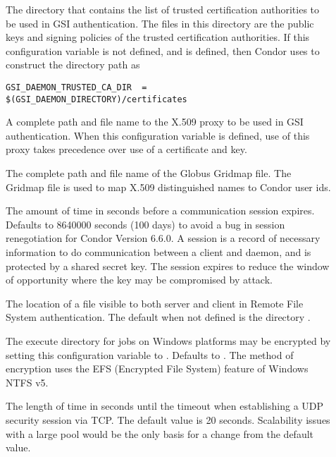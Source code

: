 \begin{description}
\item[]
\label{param:GSIDaemonTrustedCADir} The directory that contains the
list of trusted certification authorities to be used in GSI authentication.
The files in this directory are the public keys and signing policies
of the trusted certification authorities.
If this configuration variable is not defined, and
 is defined, then Condor uses
 to construct the directory path as
\begin{verbatim}
GSI_DAEMON_TRUSTED_CA_DIR  = $(GSI_DAEMON_DIRECTORY)/certificates
\end{verbatim}

\item[]
\label{param:GSIDaemonProxy} A complete path and file name to the
X.509 proxy to be used in GSI authentication.
When this configuration variable is defined, use of this proxy
takes precedence over use of a certificate and key.

\item[]
\label{param:GridMap}
The complete path and file name of the Globus Gridmap file.
The Gridmap file is used to map
X.509 distinguished names to Condor user ids.

\item[]
\label{param:SessionDuration} The amount of time in seconds before
a communication session expires.
Defaults to 8640000 seconds (100 days) to avoid a bug in session
renegotiation for Condor Version 6.6.0.
A session is a record of necessary information to do communication
between a client and daemon, and is protected by a shared secret key.
The session expires to reduce the window of opportunity where
the key may be compromised by attack.

\item[]
\label{param:FSRemoteDir}
The location of a file visible to both server and client in
Remote File System authentication.
The default when not defined is the directory 
.

\item[]
\label{param:EncryptExecuteDirectory}
The execute directory for jobs on Windows platforms may be
encrypted by setting this configuration variable to .
Defaults to .
The method of encryption uses the EFS (Encrypted File System)
feature of Windows NTFS v5.

\item[]
\label{param:SecTCPSessionTimeout}
The length of time in seconds until the timeout
when establishing a UDP security session via TCP.
The default value is 20 seconds.
Scalability issues with a large pool would be the only basis
for a change from the default value.

\end{description}

